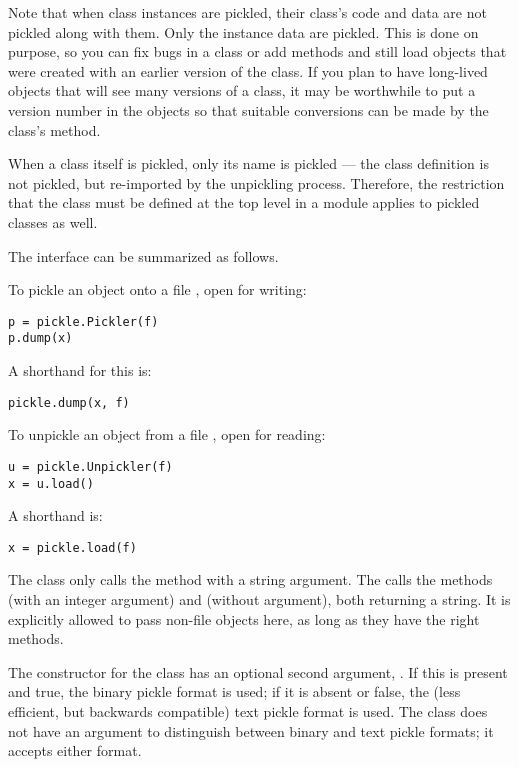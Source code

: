 Note that when class instances are pickled, their class's code and
data are not pickled along with them.  Only the instance data are
pickled.  This is done on purpose, so you can fix bugs in a class or
add methods and still load objects that were created with an earlier
version of the class.  If you plan to have long-lived objects that
will see many versions of a class, it may be worthwhile to put a version
number in the objects so that suitable conversions can be made by the
class's  method.

When a class itself is pickled, only its name is pickled --- the class
definition is not pickled, but re-imported by the unpickling process.
Therefore, the restriction that the class must be defined at the top
level in a module applies to pickled classes as well.


The interface can be summarized as follows.

To pickle an object  onto a file , open for writing:

\begin{verbatim}
p = pickle.Pickler(f)
p.dump(x)
\end{verbatim}

A shorthand for this is:

\begin{verbatim}
pickle.dump(x, f)
\end{verbatim}

To unpickle an object  from a file , open for reading:

\begin{verbatim}
u = pickle.Unpickler(f)
x = u.load()
\end{verbatim}

A shorthand is:

\begin{verbatim}
x = pickle.load(f)
\end{verbatim}

The  class only calls the method  with a
string argument.  The  calls the methods 
(with an integer argument) and  (without argument),
both returning a string.  It is explicitly allowed to pass non-file
objects here, as long as they have the right methods.

The constructor for the  class has an optional second
argument, .  If this is present and true, the binary
pickle format is used; if it is absent or false, the (less efficient,
but backwards compatible) text pickle format is used.  The
 class does not have an argument to distinguish
between binary and text pickle formats; it accepts either format.

